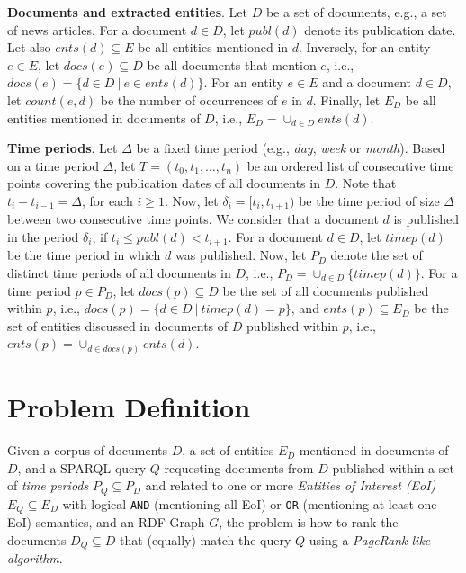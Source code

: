 \documentclass{article}
\newcommand{\q}[1]{\lq\lq{}{}#1\rq\rq{}{}}
\begin{document}
\vspace{2mm} \noindent
{\bf Documents and extracted entities}.
Let $D$ be a set of documents, e.g., a set of news articles.
For a document $d \in D$, let $publ(d)$ denote its publication date.
Let also  $ents(d) \subseteq E$ be all entities mentioned in $d$.
Inversely, for an entity $e \in E$, let $docs(e) \subseteq D$
be all documents that mention $e$, i.e., $docs(e) = \{d \in D ~|~ e \in ents(d)\}$.
For an entity $e \in E$ and a document $d \in D$,
let $count(e, d)$ be the number of occurrences of $e$ in $d$.
Finally, let $E_D$ be all entities mentioned in documents of $D$,
i.e., $E_D = \cup_{d \in D}{ents(d)}$.

\vspace{2mm} \noindent
{\bf Time periods}.
Let $\Delta$ be a fixed time period (e.g., {\em day}, {\em week} or {\em month}).
Based on a time period $\Delta$,
let $T = (t_0, t_1, \dots, t_n)$ be an ordered list of consecutive time points
covering the publication dates of all documents in $D$.
Note that $t_i - t_{i-1} = \Delta$, for each $i \geq 1$.
Now, let $\delta_i = [t_i, t_{i+1})$ be the time period of size $\Delta$ between two consecutive time points.
We consider that a document $d$ is published in the period $\delta_i$, if $t_i \leq publ(d) < t_{i+1}$.
For a document $d \in D$, let $timep(d)$ be the time period in which $d$ was published.
Now, let $P_D$ denote the set of distinct time periods of all documents in $D$,
i.e., $P_D = \cup_{d \in D}{\{timep(d)\}}$.
For a time period $p \in P_D$, let $docs(p) \subseteq D$ be the set of all
documents published within $p$, i.e., $docs(p) = \{d \in D ~|~ timep(d) = p\}$,
and $ents(p) \subseteq E_D$ be the set of
entities discussed in documents of $D$ published within $p$,
i.e., $ents(p) = \cup_{d \in docs(p)}{ents(d)}$.

\section{Problem Definition}
Given a corpus of documents $D$,
a set of entities $E_D$ mentioned in documents of $D$,
and a SPARQL query $Q$ requesting documents from $D$
published within a set of {\em time periods} $P_Q \subseteq P_D$ and
related to one or more {\em Entities of Interest (EoI)} $E_Q \subseteq E_D$
with logical {\tt AND} (mentioning all EoI) or {\tt OR} (mentioning at least one EoI) semantics,
and an RDF Graph $G$, 
the problem is how to rank the documents $D_Q \subseteq D$ that (equally) match the query $Q$ using a {\em PageRank-like algorithm}.
\end{document}
